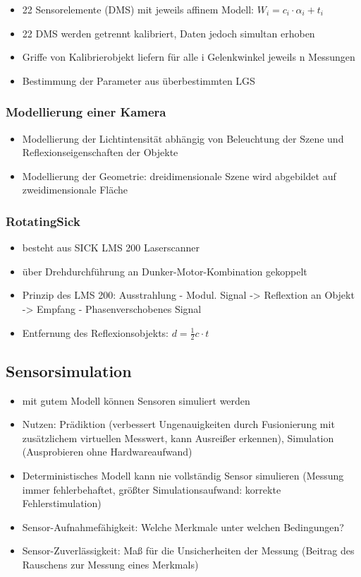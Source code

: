 \documentclass[paper=a4, fontsize=11pt]{scrartcl} %
\numberwithin{equation}{section} %
\numberwithin{figure}{section} %
\numberwithin{table}{section} %
\begin{document}
\begin{itemize}
\item 22 Sensorelemente (DMS) mit jeweils affinem Modell: $W_i = c_i \cdot \alpha_i + t_i$
\item 22 DMS werden getrennt kalibriert, Daten jedoch simultan erhoben
\item Griffe von Kalibrierobjekt liefern für alle i Gelenkwinkel jeweils n Messungen
\item Bestimmung der Parameter aus überbestimmten LGS
\end{itemize}

\subsubsection{Modellierung einer Kamera}

\begin{itemize}
\item Modellierung der Lichtintensität abhängig von Beleuchtung der Szene und Reflexionseigenschaften der Objekte
\item Modellierung der Geometrie: dreidimensionale Szene wird abgebildet auf zweidimensionale Fläche
\end{itemize}

\subsubsection{RotatingSick}

\begin{itemize}
\item besteht aus SICK LMS 200 Laserscanner
\item über Drehdurchführung an Dunker-Motor-Kombination gekoppelt
\item Prinzip des LMS 200: Ausstrahlung - Modul. Signal -> Reflextion an Objekt -> Empfang - Phasenverschobenes Signal
\item Entfernung des Reflexionsobjekts: $d = \frac{1}{2} c \cdot t$
\end{itemize}

\subsection{Sensorsimulation}

\begin{itemize}
\item mit gutem Modell können Sensoren simuliert werden
\item Nutzen: Prädiktion (verbessert Ungenauigkeiten durch Fusionierung mit zusätzlichem virtuellen Messwert, kann Ausreißer erkennen), Simulation (Ausprobieren ohne Hardwareaufwand)
\item Deterministisches Modell kann nie vollständig Sensor simulieren (Messung immer fehlerbehaftet, größter Simulationsaufwand: korrekte Fehlerstimulation)
\item Sensor-Aufnahmefähigkeit: Welche Merkmale unter welchen Bedingungen?
\item Sensor-Zuverlässigkeit: Maß für die Unsicherheiten der Messung (Beitrag des Rauschens zur Messung eines Merkmals)
\end{itemize}
\end{document}
